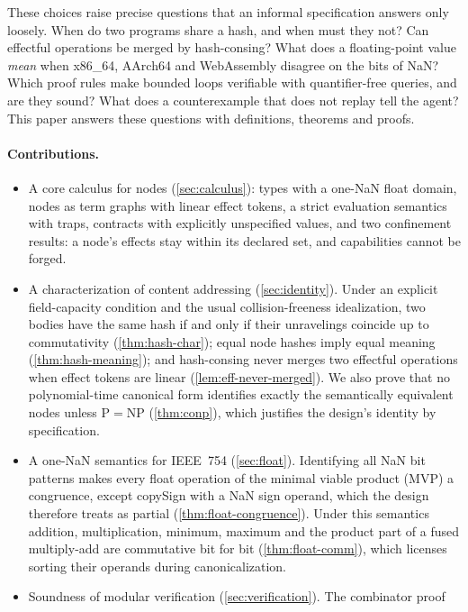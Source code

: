 These choices raise precise questions that an informal specification answers only loosely.
When do two programs share a hash, and when must they not? Can effectful operations be merged
by hash-consing? What does a floating-point value \emph{mean} when x86\_64, AArch64 and
WebAssembly disagree on the bits of NaN? Which proof rules make bounded loops verifiable with
quantifier-free queries, and are they sound? What does a counterexample that does not replay
tell the agent? This paper answers these questions with definitions, theorems and proofs.

\paragraph{Contributions.}
\begin{itemize}
\item A core calculus for \VG{} nodes (\cref{sec:calculus}): types with a one-NaN float
  domain, nodes as term graphs with linear effect tokens, a strict evaluation semantics with
  traps, contracts with explicitly unspecified values, and two confinement results: a node's
  effects stay within its declared set, and capabilities cannot be forged.
\item A characterization of content addressing (\cref{sec:identity}). Under an explicit
  field-capacity condition and the usual collision-freeness idealization, two bodies have the
  same hash if and only if their unravelings coincide up to commutativity
  (\cref{thm:hash-char}); equal node hashes imply equal meaning (\cref{thm:hash-meaning}); and
  hash-consing never merges two effectful operations when effect tokens are linear
  (\cref{lem:eff-never-merged}). We also prove that no polynomial-time canonical form
  identifies exactly the semantically equivalent nodes unless $\mathrm{P}=\mathrm{NP}$
  (\cref{thm:conp}), which justifies the design's identity by specification.
\item A one-NaN semantics for IEEE~754 (\cref{sec:float}). Identifying all NaN bit patterns
  makes every float operation of the minimal viable product (MVP) a congruence, except
  copySign with a NaN sign operand, which the design therefore treats as partial
  (\cref{thm:float-congruence}). Under this semantics addition, multiplication, minimum,
  maximum and the product part of a fused multiply-add are commutative bit for bit
  (\cref{thm:float-comm}), which licenses sorting their operands during canonicalization.
\item Soundness of modular verification (\cref{sec:verification}). The combinator proof

\end{itemize}
